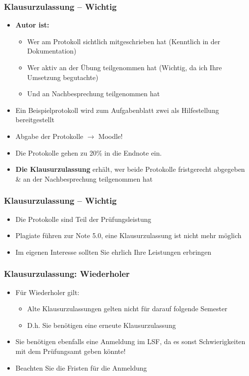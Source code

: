 \documentclass[xcolor=dvipsnames,aspectratio=169]{beamer}
\begin{document}
\begin{frame}
	\frametitle{Klausurzulassung -- \textbf{Wichtig}}
	\begin{itemize}
		\item \textbf{Autor ist:} 
			\begin{itemize}
				\item Wer am Protokoll sichtlich mitgeschrieben hat (Kenntlich in der Dokumentation)
				\item Wer aktiv an der Übung teilgenommen hat (Wichtig, da ich Ihre Umsetzung begutachte)
				\item Und an Nachbesprechung teilgenommen hat
			\end{itemize}
			\item Ein Beispielprotokoll wird zum Aufgabenblatt zwei als Hilfestellung bereitgestellt
			\item Abgabe der Protokolle $\rightarrow$ Moodle!
			\item Die Protokolle gehen zu 20\% in die Endnote ein.
			\item \textbf{Die Klausurzulassung} erhält, wer beide Protokolle fristgerecht abgegeben \& an der Nachbesprechung teilgenommen hat
		\end{itemize}
\end{frame}

\begin{frame}
	\frametitle{Klausurzulassung -- \textbf{Wichtig}}
	\begin{itemize}
		\item Die Protokolle sind Teil der Prüfungsleistung
		\item Plagiate führen zur Note 5.0, eine Klausurzulassung ist nicht mehr möglich
		\item Im eigenen Interesse sollten Sie ehrlich Ihre Leistungen erbringen
	\end{itemize}
\end{frame}

\begin{frame}
	\frametitle{Klausurzulassung: Wiederholer}
	\begin{itemize}
		\item Für Wiederholer gilt:
		\begin{itemize}
			\item Alte Klausurzulassungen gelten nicht für darauf folgende Semester
			\item D.h. Sie benötigen eine erneute Klausurzulassung
		\end{itemize}
		\item Sie benötigen ebenfalls eine Anmeldung im LSF, da es sonst Schwierigkeiten mit dem Prüfungsamt geben könnte!
		\item Beachten Sie die Fristen für die Anmeldung
	\end{itemize}
\end{frame}
\end{document}
